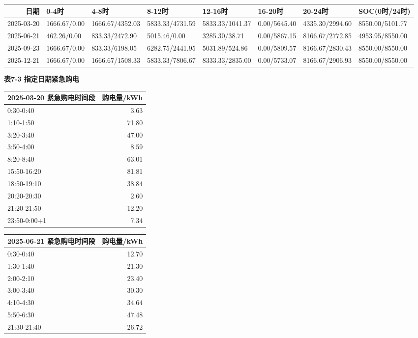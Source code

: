 \documentclass[12pt,a4paper]{ctexart}
\begin{document}
\begin{table}[htbp]
\centering
\small
\begin{tabularx}{\textwidth}{@{}r X X X X X X X@{}}
\toprule
日期 & 0-4时 & 4-8时 & 8-12时 & 12-16时 & 16-20时 & 20-24时 & SOC(0时/24时) \\
\midrule
2025-03-20 & 1666.67/0.00 & 1666.67/4352.03 & 5833.33/4731.59 & 5833.33/1041.37 & 0.00/5645.40 & 4335.30/2994.60 & 8550.00/5101.77 \\
2025-06-21 & 462.26/0.00 & 833.33/2472.90 & 5015.46/0.00 & 3285.30/38.71 & 0.00/5867.15 & 8166.67/2772.85 & 4953.95/8550.00 \\
2025-09-23 & 1666.67/0.00 & 833.33/6198.05 & 6282.75/2441.95 & 5031.89/524.86 & 0.00/5809.57 & 8166.67/2830.43 & 8550.00/8550.00 \\
2025-12-21 & 1666.67/0.00 & 1666.67/1508.33 & 5833.33/7806.67 & 8333.33/2835.00 & 0.00/5733.07 & 8166.67/2906.93 & 8550.00/8550.00 \\
\bottomrule
\end{tabularx}
\end{table}
\textbf{表7-3 指定日期紧急购电}\par
\begin{table}[htbp]
\centering
\small
\begin{tabularx}{\textwidth}{@{}X r@{}}
\toprule
2025-03-20 紧急购电时间段 & 购电量/kWh \\
\midrule
0:30-0:40 & 3.63 \\
1:10-1:50 & 71.80 \\
3:20-3:40 & 47.00 \\
3:50-4:00 & 8.59 \\
8:20-8:40 & 63.01 \\
15:50-16:20 & 81.81 \\
18:50-19:10 & 38.84 \\
20:20-20:30 & 2.60 \\
21:20-21:50 & 12.20 \\
23:50-0:00+1 & 7.34 \\
\bottomrule
\end{tabularx}
\end{table}
\begin{table}[htbp]
\centering
\small
\begin{tabularx}{\textwidth}{@{}X r@{}}
\toprule
2025-06-21 紧急购电时间段 & 购电量/kWh \\
\midrule
0:30-0:40 & 12.70 \\
1:30-1:40 & 21.30 \\
2:00-2:10 & 23.40 \\
3:00-3:40 & 30.30 \\
4:10-4:30 & 34.64 \\
5:50-6:30 & 47.48 \\
21:30-21:40 & 26.72 \\
\bottomrule
\end{tabularx}
\end{table}
\end{document}
